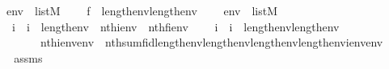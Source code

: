 \begin{isabellebody}
\ \ \ \ {\isachardoublequoteopen}env{\isacharprime}{\kern0pt}\ {\isasymin}\ list{\isacharparenleft}{\kern0pt}M{\isacharparenright}{\kern0pt}{\isachardoublequoteclose}\isanewline
\ \ \ \ {\isachardoublequoteopen}f\ {\isasymin}\ length{\isacharparenleft}{\kern0pt}env{\isacharparenright}{\kern0pt}{\isasymrightarrow}length{\isacharparenleft}{\kern0pt}env{\isacharprime}{\kern0pt}{\isacharparenright}{\kern0pt}{\isachardoublequoteclose}\isanewline
\ \ \ \ {\isachardoublequoteopen}env{}\ {\isasymin}\ list{\isacharparenleft}{\kern0pt}M{\isacharparenright}{\kern0pt}{\isachardoublequoteclose}\isanewline
\ \ \ \ {\isachardoublequoteopen}{\isasymAnd}\ i\ {\isachardot}{\kern0pt}\ i\ {\isacharless}{\kern0pt}\ length{\isacharparenleft}{\kern0pt}env{\isacharparenright}{\kern0pt}\ {\isasymLongrightarrow}\ nth{\isacharparenleft}{\kern0pt}i{\isacharcomma}{\kern0pt}env{\isacharparenright}{\kern0pt}\ {\isacharequal}{\kern0pt}\ nth{\isacharparenleft}{\kern0pt}f{\isacharbackquote}{\kern0pt}i{\isacharcomma}{\kern0pt}env{\isacharprime}{\kern0pt}{\isacharparenright}{\kern0pt}{\isachardoublequoteclose}\isanewline
\ \ \ {\isachardoublequoteopen}{\isasymAnd}\ i\ {\isachardot}{\kern0pt}\ i\ {\isacharless}{\kern0pt}\ length{\isacharparenleft}{\kern0pt}env{\isacharparenright}{\kern0pt}{\isacharhash}{\kern0pt}{\isacharplus}{\kern0pt}length{\isacharparenleft}{\kern0pt}env{}{\isacharparenright}{\kern0pt}\ {\isasymLongrightarrow}\isanewline
\ \ \ \ \ \ \ \ \ \ nth{\isacharparenleft}{\kern0pt}i{\isacharcomma}{\kern0pt}env{\isacharat}{\kern0pt}env{}{\isacharparenright}{\kern0pt}\ {\isacharequal}{\kern0pt}\ nth{\isacharparenleft}{\kern0pt}sum{\isacharparenleft}{\kern0pt}f{\isacharcomma}{\kern0pt}id{\isacharparenleft}{\kern0pt}length{\isacharparenleft}{\kern0pt}env{}{\isacharparenright}{\kern0pt}{\isacharparenright}{\kern0pt}{\isacharcomma}{\kern0pt}length{\isacharparenleft}{\kern0pt}env{\isacharparenright}{\kern0pt}{\isacharcomma}{\kern0pt}length{\isacharparenleft}{\kern0pt}env{\isacharprime}{\kern0pt}{\isacharparenright}{\kern0pt}{\isacharcomma}{\kern0pt}length{\isacharparenleft}{\kern0pt}env{}{\isacharparenright}{\kern0pt}{\isacharparenright}{\kern0pt}{\isacharbackquote}{\kern0pt}i{\isacharcomma}{\kern0pt}env{\isacharprime}{\kern0pt}{\isacharat}{\kern0pt}env{}{\isacharparenright}{\kern0pt}{\isachardoublequoteclose}\isanewline
%
\isadelimproof
%
\endisadelimproof
%
\isatagproof
{}\isamarkupfalse%
\ {\isacharminus}{\kern0pt}\isanewline
\ \ \isamarkupfalse%
\ assms\isanewline

\end{isabellebody}
